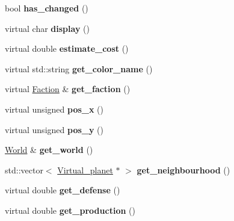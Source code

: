 \begin{DoxyCompactItemize}
\item 
\hypertarget{classVirtual__planet_ab47d3e56b68242189b6df870d45c5157}{bool {\bfseries has\-\_\-changed} ()}\label{classVirtual__planet_ab47d3e56b68242189b6df870d45c5157}

\item 
\hypertarget{classVirtual__planet_affaf5157ca3fb7e3d5c9fac1736578a3}{virtual char {\bfseries display} ()}\label{classVirtual__planet_affaf5157ca3fb7e3d5c9fac1736578a3}

\item 
\hypertarget{classVirtual__planet_a7f442fee301927b27217877abb765833}{virtual double {\bfseries estimate\-\_\-cost} ()}\label{classVirtual__planet_a7f442fee301927b27217877abb765833}

\item 
\hypertarget{classVirtual__planet_a84cba41f0fa06d0512ea462a26b972e3}{virtual std\-::string {\bfseries get\-\_\-color\-\_\-name} ()}\label{classVirtual__planet_a84cba41f0fa06d0512ea462a26b972e3}

\item 
\hypertarget{classVirtual__planet_ac0d0e30029566b9113652c04ec2e6599}{virtual \hyperlink{classFaction}{Faction} \& {\bfseries get\-\_\-faction} ()}\label{classVirtual__planet_ac0d0e30029566b9113652c04ec2e6599}

\item 
\hypertarget{classVirtual__planet_acccedbd81a89f4ad75a6a5c1c09b044c}{virtual unsigned {\bfseries pos\-\_\-x} ()}\label{classVirtual__planet_acccedbd81a89f4ad75a6a5c1c09b044c}

\item 
\hypertarget{classVirtual__planet_a3453bf12cb4d348aee6594c127ba6a56}{virtual unsigned {\bfseries pos\-\_\-y} ()}\label{classVirtual__planet_a3453bf12cb4d348aee6594c127ba6a56}

\item 
\hypertarget{classVirtual__planet_a1d3474a2ca3833a770c3763884a84323}{\hyperlink{classWorld}{World} \& {\bfseries get\-\_\-world} ()}\label{classVirtual__planet_a1d3474a2ca3833a770c3763884a84323}

\item 
\hypertarget{classVirtual__planet_a996699dcad7e99262842e06079896ed1}{std\-::vector$<$ \hyperlink{classVirtual__planet}{Virtual\-\_\-planet} $\ast$ $>$ {\bfseries get\-\_\-neighbourhood} ()}\label{classVirtual__planet_a996699dcad7e99262842e06079896ed1}

\item 
\hypertarget{classVirtual__planet_a25045d61c5ee29b94de56db88fa96f98}{virtual double {\bfseries get\-\_\-defense} ()}\label{classVirtual__planet_a25045d61c5ee29b94de56db88fa96f98}

\item 
\hypertarget{classVirtual__planet_a4294d3312671d720dca0b72a1648e6a4}{virtual double {\bfseries get\-\_\-production} ()}\label{classVirtual__planet_a4294d3312671d720dca0b72a1648e6a4}

\end{DoxyCompactItemize}
